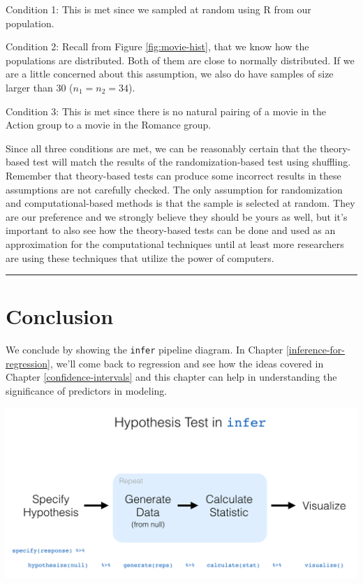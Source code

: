 \documentclass[12pt, krantz2,]{krantz}
\begin{document}
Condition 1: This is met since we sampled at random using R from our population.

Condition 2: Recall from Figure \ref{fig:movie-hist}, that we know how the populations are distributed. Both of them are close to normally distributed. If we are a little concerned about this assumption, we also do have samples of size larger than 30 (\(n_1 = n_2 = 34\)).

Condition 3: This is met since there is no natural pairing of a movie in the Action group to a movie in the Romance group.

Since all three conditions are met, we can be reasonably certain that the theory-based test will match the results of the randomization-based test using shuffling. Remember that theory-based tests can produce some incorrect results in these assumptions are not carefully checked. The only assumption for randomization and computational-based methods is that the sample is selected at random. They are our preference and we strongly believe they should be yours as well, but it's important to also see how the theory-based tests can be done and used as an approximation for the computational techniques until at least more researchers are using these techniques that utilize the power of computers.

\begin{center}\rule{0.5\linewidth}{\linethickness}\end{center}

\hypertarget{conclusion-7}{%
\section{Conclusion}\label{conclusion-7}}

We conclude by showing the \texttt{infer} pipeline diagram. In Chapter \ref{inference-for-regression}, we'll come back to regression and see how the ideas covered in Chapter \ref{confidence-intervals} and this chapter can help in understanding the significance of predictors in modeling.

\begin{center}\includegraphics[width=\textwidth]{images/flowcharts/infer/ht_diagram} \end{center}
\end{document}
